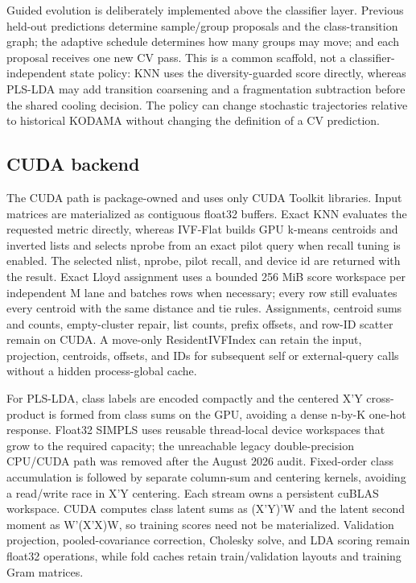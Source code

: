 \documentclass[twoside,11pt]{article}
\begin{document}
\begin{small}
Guided evolution is deliberately implemented above the classifier layer. Previous held-out predictions determine sample/group proposals and the class-transition graph; the adaptive schedule determines how many groups may move; and each proposal receives one new CV pass. This is a common scaffold, not a classifier-independent state policy: KNN uses the diversity-guarded score directly, whereas PLS-LDA may add transition coarsening and a fragmentation subtraction before the shared cooling decision. The policy can change stochastic trajectories relative to historical KODAMA without changing the definition of a CV prediction.

\subsection{CUDA backend}
The CUDA path is package-owned and uses only CUDA Toolkit libraries. Input matrices are materialized as contiguous float32 buffers. Exact KNN evaluates the requested metric directly, whereas IVF-Flat builds GPU k-means centroids and inverted lists and selects nprobe from an exact pilot query when recall tuning is enabled. The selected nlist, nprobe, pilot recall, and device id are returned with the result. Exact Lloyd assignment uses a bounded 256 MiB score workspace per independent M lane and batches rows when necessary; every row still evaluates every centroid with the same distance and tie rules. Assignments, centroid sums and counts, empty-cluster repair, list counts, prefix offsets, and row-ID scatter remain on CUDA. A move-only ResidentIVFIndex can retain the input, projection, centroids, offsets, and IDs for subsequent self or external-query calls without a hidden process-global cache.

For PLS-LDA, class labels are encoded compactly and the centered X'Y cross-product is formed from class sums on the GPU, avoiding a dense n-by-K one-hot response. Float32 SIMPLS uses reusable thread-local device workspaces that grow to the required capacity; the unreachable legacy double-precision CPU/CUDA path was removed after the August 2026 audit. Fixed-order class accumulation is followed by separate column-sum and centering kernels, avoiding a read/write race in X'Y centering. Each stream owns a persistent cuBLAS workspace. CUDA computes class latent sums as (X'Y)'W and the latent second moment as W'(X'X)W, so training scores need not be materialized. Validation projection, pooled-covariance correction, Cholesky solve, and LDA scoring remain float32 operations, while fold caches retain train/validation layouts and training Gram matrices.


\end{small}
\end{document}
